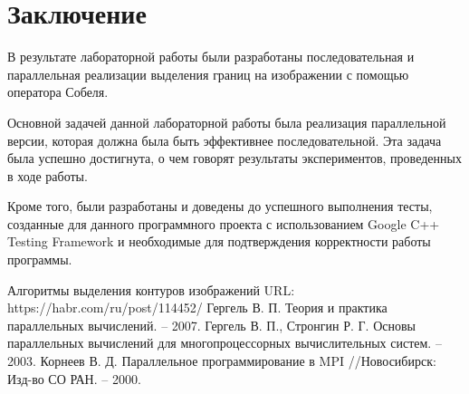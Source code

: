 \documentclass{report}
\begin{document}
\section*{Заключение}
В результате лабораторной работы были разработаны последовательная и параллельная реализации выделения границ на изображении с помощью оператора Собеля.
\par Основной задачей данной лабораторной работы была реализация параллельной версии, которая должна была быть эффективнее последовательной. Эта задача была успешно достигнута, о чем говорят результаты экспериментов, проведенных в ходе работы. 
\par Кроме того, были разработаны и доведены до успешного выполнения тесты, созданные для данного программного проекта с использованием Google C++ Testing Framework и необходимые для подтверждения корректности работы программы.
\newpage

\begin{thebibliography}{1}
Алгоритмы выделения контуров изображений URL: https://habr.com/ru/post/114452/
Гергель В. П. Теория и практика параллельных вычислений. – 2007.
Гергель В. П., Стронгин Р. Г. Основы параллельных вычислений для многопроцессорных вычислительных систем. – 2003.
Корнеев В. Д. Параллельное программирование в MPI //Новосибирск: Изд-во СО РАН. – 2000.
\end{thebibliography}
\newpage

\end{document}
